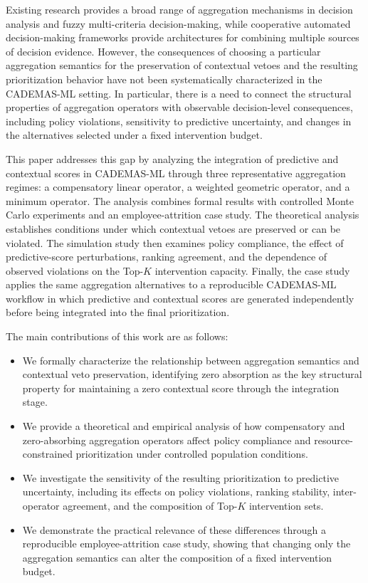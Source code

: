 \documentclass[mathematics,article,submit,moreauthors]{Definitions/mdpi}
\begin{document}
Existing research provides a broad range of aggregation mechanisms in
decision analysis and fuzzy multi-criteria decision-making, while cooperative
automated decision-making frameworks provide architectures for combining
multiple sources of decision evidence. However, the consequences of choosing
a particular aggregation semantics for the preservation of contextual
vetoes and the resulting prioritization behavior have not been systematically
characterized in the CADEMAS-ML setting. In particular, there is a need to
connect the structural properties of aggregation operators with observable
decision-level consequences, including policy violations, sensitivity to
predictive uncertainty, and changes in the alternatives selected under a
fixed intervention budget.

This paper addresses this gap by analyzing the integration of predictive and
contextual scores in CADEMAS-ML through three representative aggregation
regimes: a compensatory linear operator, a weighted geometric operator, and a
minimum operator. The analysis combines formal results with controlled
Monte Carlo experiments and an employee-attrition case study. The theoretical
analysis establishes conditions under which contextual vetoes are preserved
or can be violated. The simulation study then examines policy compliance,
the effect of predictive-score perturbations, ranking agreement, and the
dependence of observed violations on the Top-$K$ intervention capacity.
Finally, the case study applies the same aggregation alternatives to a
reproducible CADEMAS-ML workflow in which predictive and contextual scores
are generated independently before being integrated into the final
prioritization.

The main contributions of this work are as follows:
\begin{itemize}
    \item We formally characterize the relationship between aggregation
    semantics and contextual veto preservation, identifying zero absorption
    as the key structural property for maintaining a zero contextual score
    through the integration stage.
    
    \item We provide a theoretical and empirical analysis of how compensatory
    and zero-absorbing aggregation operators affect policy compliance and
    resource-constrained prioritization under controlled population
    conditions.
    
    \item We investigate the sensitivity of the resulting prioritization to
    predictive uncertainty, including its effects on policy violations,
    ranking stability, inter-operator agreement, and the composition of
    Top-$K$ intervention sets.
    
    \item We demonstrate the practical relevance of these differences through
    a reproducible employee-attrition case study, showing that changing only
    the aggregation semantics can alter the composition of a fixed
    intervention budget.
\end{itemize}
\end{document}
